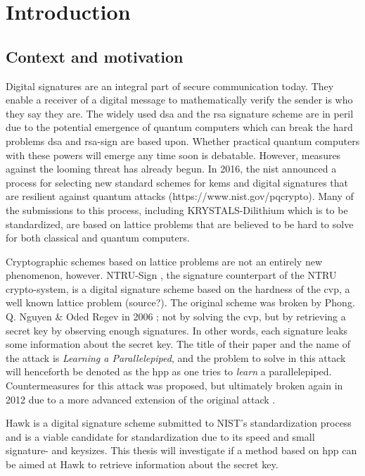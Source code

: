 \chapter{Introduction}
\section{Context and motivation}
Digital signatures are an integral part of secure communication today. They enable a receiver of a digital message to mathematically verify the sender is who they say they are. 
The widely used \gls{dsa} and the \gls{rsa} 
signature scheme are in peril due to the potential emergence of quantum computers which can break the hard problems \gls{dsa} and \gls{rsa}-sign are based upon.
Whether practical quantum computers with these powers will emerge any time soon is debatable. However, measures against the looming threat has already begun. 
In 2016, the \gls{nist} announced a process for selecting new standard schemes for \gls{kems} and 
digital signatures that are resilient against quantum attacks (https://www.nist.gov/pqcrypto). Many of the submissions to this process, including KRYSTALS-Dilithium which is to be standardized, 
are based on lattice problems that are believed to be hard to solve for both classical and quantum computers.

Cryptographic schemes based on lattice problems are not an entirely new phenomenon, however. NTRU-Sign \cite{NTRUSign03}, the signature counterpart of the NTRU crypto-system,
is a digital signature scheme based on the hardness of the \gls{cvp}, a well known lattice problem (source?).
The original scheme was broken by Phong. Q. Nguyen \& Oded Regev in 2006 \cite{NR09}; not by solving the \gls{cvp}, but by retrieving a secret key by observing enough signatures.
In other words, each signature leaks some information about the secret key.
The title of their paper and the name of the attack is \textit{Learning a Parallelepiped}, and the problem to solve in this attack will henceforth be denoted as the \gls{hpp} as one tries to \textit{learn} a parallelepiped.
Countermeasures for this attack was proposed, but ultimately broken again in 2012 due to a more advanced extension of the original attack \cite{Zonotope12}.

Hawk \cite{HawkSpec24} is a digital signature scheme submitted to NIST's standardization process and is a viable candidate for standardization
due to its speed and small signature- and keysizes. This thesis will investigate if a method based on \gls{hpp} can be aimed at
Hawk to retrieve information about the secret key.

